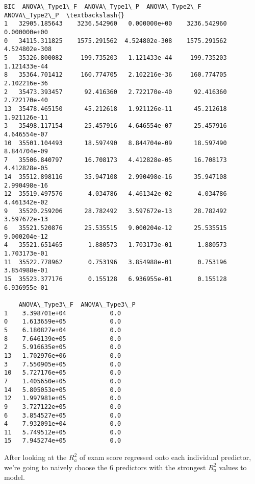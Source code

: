 \documentclass[11pt]{article}
\begin{document}
\begin{tcolorbox}[breakable, size=fbox, boxrule=.5pt, pad at break*=1mm, opacityfill=0]
\begin{Verbatim}[commandchars=\\\{\}]
             BIC  ANOVA\_Type1\_F  ANOVA\_Type1\_P  ANOVA\_Type2\_F  ANOVA\_Type2\_P  \textbackslash{}
1   32905.185643    3236.542960   0.000000e+00    3236.542960   0.000000e+00
0   34115.311825    1575.291562  4.524802e-308    1575.291562  4.524802e-308
5   35326.800082     199.735203   1.121433e-44     199.735203   1.121433e-44
8   35364.701412     160.774705   2.102216e-36     160.774705   2.102216e-36
2   35473.393457      92.416360   2.722170e-40      92.416360   2.722170e-40
13  35478.465150      45.212618   1.921126e-11      45.212618   1.921126e-11
3   35498.117154      25.457916   4.646554e-07      25.457916   4.646554e-07
10  35501.104493      18.597490   8.844704e-09      18.597490   8.844704e-09
7   35506.840797      16.708173   4.412828e-05      16.708173   4.412828e-05
14  35512.898116      35.947108   2.990498e-16      35.947108   2.990498e-16
12  35519.497576       4.034786   4.461342e-02       4.034786   4.461342e-02
9   35520.259206      28.782492   3.597672e-13      28.782492   3.597672e-13
6   35521.520876      25.535515   9.000204e-12      25.535515   9.000204e-12
4   35521.651465       1.880573   1.703173e-01       1.880573   1.703173e-01
11  35522.778962       0.753196   3.854988e-01       0.753196   3.854988e-01
15  35523.377176       0.155128   6.936955e-01       0.155128   6.936955e-01

    ANOVA\_Type3\_F  ANOVA\_Type3\_P
1    3.398701e+04            0.0
0    1.613659e+05            0.0
5    6.180827e+04            0.0
8    7.646139e+05            0.0
2    5.916635e+05            0.0
13   1.702976e+06            0.0
3    7.550905e+05            0.0
10   5.727176e+05            0.0
7    1.405650e+05            0.0
14   5.805053e+05            0.0
12   1.997981e+05            0.0
9    3.727122e+05            0.0
6    3.854527e+05            0.0
4    7.932091e+04            0.0
11   5.749512e+05            0.0
15   7.945274e+05            0.0
\end{Verbatim}
\end{tcolorbox}
        
    After looking at the \(R^2_{a}\) of exam score regressed onto each
individual predictor, we're going to naively choose the 6 predictors
with the strongest \(R^2_{a}\) values to model.
\end{document}
